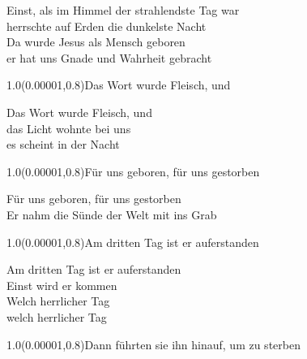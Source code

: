\documentclass[aspectratio=169]{beamer}
\begin{document}
\color{white}
\begin{frame}
\centering
\color{white}
\huge{Einst, als im Himmel der strahlendste Tag war} \\
\huge{herrschte auf Erden die dunkelste Nacht} \\
\huge{Da wurde Jesus als Mensch geboren} \\
\huge{er hat uns Gnade und Wahrheit gebracht} \\

\begin{textblock}{1.0}(0.00001,0.8)\color{gray}\normalsize{Das Wort wurde Fleisch, und}\end{textblock}
\end{frame}

\begin{frame}
\centering
\color{white}
\huge{Das Wort wurde Fleisch, und} \\
\huge{das Licht wohnte bei uns} \\
\huge{es scheint in der Nacht} \\

\begin{textblock}{1.0}(0.00001,0.8)\color{gray}\normalsize{Für uns geboren, für uns gestorben}\end{textblock}
\end{frame}

\begin{frame}
\centering
\color{white}
\huge{Für uns geboren, für uns gestorben} \\
\huge{Er nahm die Sünde der Welt mit ins Grab} \\

\begin{textblock}{1.0}(0.00001,0.8)\color{gray}\normalsize{Am dritten Tag ist er auferstanden}\end{textblock}
\end{frame}

\begin{frame}
\centering
\color{white}
\huge{Am dritten Tag ist er auferstanden} \\
\huge{Einst wird er kommen} \\
\huge{Welch herrlicher Tag} \\
\huge{welch herrlicher Tag} \\

\begin{textblock}{1.0}(0.00001,0.8)\color{gray}\normalsize{Dann führten sie ihn hinauf, um zu sterben}\end{textblock}
\end{frame}
\end{document}
